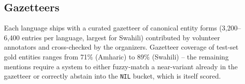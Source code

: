\subsection{Gazetteers}
Each language ships with a curated gazetteer of canonical entity forms
(3{,}200--6{,}400 entries per language, largest for Swahili) contributed by
volunteer annotators and cross-checked by the organizers. Gazetteer
coverage of test-set gold entities ranges from 71\% (Amharic) to 89\%
(Swahili) -- the remaining mentions require a system to either fuzzy-match
a near-variant already in the gazetteer or correctly abstain into the
\texttt{NIL} bucket, which is itself scored.
